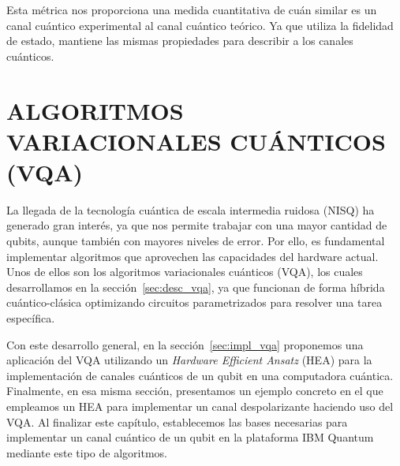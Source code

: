 \documentclass[letterpaper,12pt]{thesisECFM}
\theoremstyle{plain}
\theoremstyle{definition}
\theoremstyle{definition}
\theoremstyle{remark}
\newcommand{\1}{\mathbb{1}}
\begin{document}
Esta métrica nos proporciona una medida cuantitativa de cuán similar es un canal cuántico experimental al canal cuántico teórico. Ya que utiliza la fidelidad de estado, mantiene las mismas propiedades para describir a los canales cuánticos. 

\chapter{ALGORITMOS VARIACIONALES CUÁNTICOS (VQA)} %
\label{cap:algoritmos_variacionales}
La llegada de la tecnología cuántica de escala intermedia ruidosa (NISQ) ha generado
gran interés, ya que nos permite trabajar con una mayor cantidad de qubits, aunque
también con mayores niveles de error. Por ello, es fundamental implementar
algoritmos que aprovechen las capacidades del hardware actual. Unos de ellos
son los algoritmos variacionales cuánticos (VQA), los cuales desarrollamos
en la sección~\ref{sec:desc_vqa}, ya que funcionan de forma
híbrida cuántico-clásica optimizando circuitos parametrizados para resolver
una tarea específica.

Con este desarrollo general, en la sección~\ref{sec:impl_vqa} proponemos una
aplicación del VQA utilizando un \textit{Hardware Efficient Ansatz} (HEA) para
la implementación de canales cuánticos de un qubit en una computadora cuántica.
Finalmente, en esa misma sección, presentamos un ejemplo concreto en el que
empleamos un HEA para implementar un canal despolarizante haciendo uso del VQA. 
Al finalizar este capítulo, establecemos las bases necesarias para
implementar un canal cuántico de un qubit en la plataforma IBM Quantum mediante este tipo de algoritmos.


\end{document}
